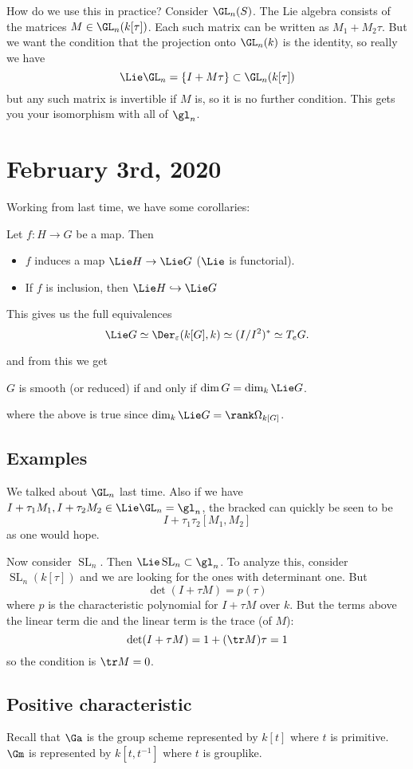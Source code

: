 \documentclass[12pt]{article}
\DeclareMathOperator{\SL}{SL}
\begin{document}
How do we use this in practice? Consider $\GL_n(S)$. The Lie algebra consists of the matrices $M\in\GL_n(k[\tau])$.
Each such matrix can be written as $M_1+M_2\tau$. But we want the condition that the projection onto $\GL_n(k)$ is the identity,
so really we have 
\[\Lie\GL_n = \{I+M\tau\}\subset\GL_n(k[\tau])\]
but any such matrix is invertible if $M$ is, so it is no further condition. This gets you your isomorphism with all of $\gl_n$.

\section{February 3rd, 2020}
Working from last time, we have some corollaries:
\begin{cor}
	Let $f:H\to G$ be a map. Then 
	\begin{itemize}
		\item $f$ induces a map $\Lie H\to \Lie G$ ($\Lie$ is functorial).
		\item If $f$ is inclusion, then $\Lie H\hookrightarrow\Lie G$
	\end{itemize}
\end{cor}
\begin{rmk}
	This gives us the full equivalences 
	\[\Lie G\simeq\Der_\varepsilon(k[G],k)\simeq (I/I^2)^\ast\simeq T_e G.\]
\end{rmk}
and from this we get 
\begin{cor}
	$G$ is smooth (or reduced) if and only if $\dim G=\dim_k \Lie G$.
\end{cor}
where the above is true since $\dim_k\Lie G=\rank \Omega_{k[G]}$.

\subsection{Examples}
We talked about $\GL_n$ last time. Also if we have $I+\tau_1M_1,I+\tau_2 M_2\in\Lie \GL_n=\gl_n$, the bracked can quickly be seen to be 
\[I+\tau_1\tau_2[M_1,M_2]\]
as one would hope.

Now consider $\SL_n$. Then $\Lie\SL_n\subset\gl_n$. To analyze this, consider $\SL_n(k[\tau])$ 
and we are looking for the ones with determinant one. But 
\[\det(I+\tau M)=p(\tau)\]
where $p$ is the characteristic polynomial for $I+\tau M$ over $k$. But the terms above the linear term die and the linear term is the trace (of $M$):
\[\det(I+\tau M)=1+(\tr M)\tau=1\]
so the condition is $\tr M=0$.

\subsection{Positive characteristic}
Recall that $\Ga$ is the group scheme represented by $k[t]$ where $t$ is primitive. $\Gm$ is 
represented by $k[t,t^{-1}]$ where $t$ is grouplike.
\end{document}
